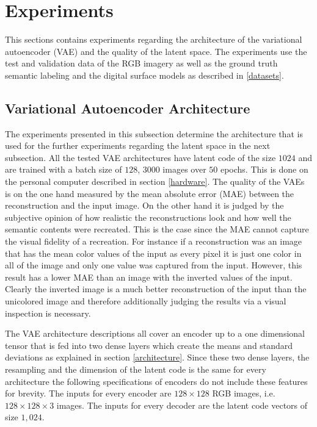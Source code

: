\section{Experiments}

This sections contains experiments regarding the architecture of the variational autoencoder (VAE)
and the quality of the latent space. The experiments use the test and validation data of the RGB
imagery as well as the ground truth semantic labeling and the digital surface models as described in
\ref{datasets}.

\subsection{Variational Autoencoder Architecture} \label{architecture_experiments}

The experiments presented in this subsection determine the architecture that is used for the further
experiments regarding the latent space in the next subsection. All the tested VAE architectures have 
latent code of the size $1024$ and are trained with a batch size of $128$, $3000$ images over $50$ epochs.
This is done on the personal computer described in section \ref{hardware}.
The quality of the VAEs is on the one hand measured by the mean absolute error (MAE)
between the reconstruction and the input image.
On the other hand it is judged by the subjective opinion of how realistic the reconstructions look and how well
the semantic contents were recreated. This is the case since the MAE 
cannot capture the visual fidelity of a recreation. For instance if a reconstruction was an image that has the mean
color values of the input as every pixel it is just one color in all of the image and only one value was captured
from the input. However, this result has a lower MAE than an image with the inverted values of the
input. Clearly the inverted image is a much better reconstruction of the input than the unicolored image and therefore
additionally judging the results via a visual inspection is necessary.

The VAE architecture descriptions all cover an encoder up to a one dimensional tensor that is fed into two dense
layers which create the means and standard deviations as explained in section \ref{architecture}. Since these two
dense layers, the resampling and the dimension of the latent code is the same for every architecture the following
specifications of encoders do not include these features for brevity.
The inputs for every encoder are $128\times 128$ RGB images, i.e. $128\times 128\times 3$ images. The inputs
for every decoder are the latent code vectors of size $1,024$.


